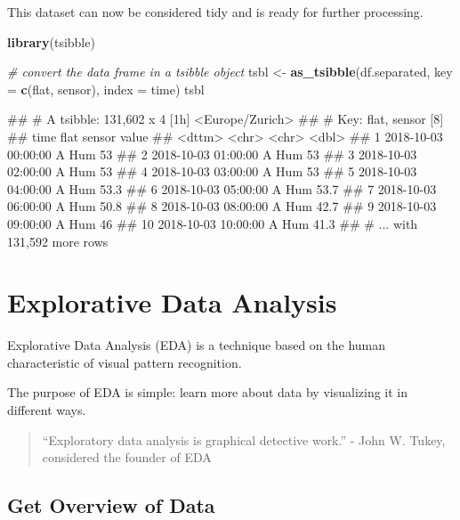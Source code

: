\documentclass[
  a4paperpaper,
]{book}
\newenvironment{Shaded}{\begin{snugshade}}{\end{snugshade}}
\newcommand{\CommentTok}[1]{\textcolor[rgb]{0.56,0.35,0.01}{\textit{#1}}}
\newcommand{\DataTypeTok}[1]{\textcolor[rgb]{0.13,0.29,0.53}{#1}}
\newcommand{\KeywordTok}[1]{\textcolor[rgb]{0.13,0.29,0.53}{\textbf{#1}}}
\newcommand{\NormalTok}[1]{#1}
\newcommand{\StringTok}[1]{\textcolor[rgb]{0.31,0.60,0.02}{#1}}
\let\oldShaded\Shaded
\let\endoldShaded\endShaded
\renewenvironment{Shaded}{\footnotesize\oldShaded}{\endoldShaded}
\let\oldverbatim\verbatim
\let\endoldverbatim\endverbatim
\renewenvironment{verbatim}{\footnotesize\oldverbatim}{\endoldverbatim}
\begin{document}
This dataset can now be considered tidy and is ready for further processing.

\begin{Shaded}
\begin{Highlighting}[]
\KeywordTok{library}\NormalTok{(tsibble)}

\CommentTok{# convert the data frame in a tsibble object}
\NormalTok{tsbl <-}\StringTok{ }\KeywordTok{as_tsibble}\NormalTok{(df.separated, }\DataTypeTok{key =} \KeywordTok{c}\NormalTok{(flat, sensor), }\DataTypeTok{index =}\NormalTok{ time)}
\NormalTok{tsbl}
\end{Highlighting}
\end{Shaded}

\begin{verbatim}
## # A tsibble: 131,602 x 4 [1h] <Europe/Zurich>
## # Key:       flat, sensor [8]
##    time                flat  sensor value
##    <dttm>              <chr> <chr>  <dbl>
##  1 2018-10-03 00:00:00 A     Hum     53  
##  2 2018-10-03 01:00:00 A     Hum     53  
##  3 2018-10-03 02:00:00 A     Hum     53  
##  4 2018-10-03 03:00:00 A     Hum     53  
##  5 2018-10-03 04:00:00 A     Hum     53.3
##  6 2018-10-03 05:00:00 A     Hum     53.7
##  7 2018-10-03 06:00:00 A     Hum     50.8
##  8 2018-10-03 08:00:00 A     Hum     42.7
##  9 2018-10-03 09:00:00 A     Hum     46  
## 10 2018-10-03 10:00:00 A     Hum     41.3
## # ... with 131,592 more rows
\end{verbatim}

\hypertarget{explorative-data-analysis}{%
\chapter{Explorative Data Analysis}\label{explorative-data-analysis}}

Explorative Data Analysis (EDA) is a technique based on the human characteristic of visual pattern recognition.

The purpose of EDA is simple: learn more about data by visualizing it in different ways.

\begin{quote}
``Exploratory data analysis is graphical detective work.'' - John W. Tukey, considered the founder of EDA
\end{quote}

\hypertarget{get-overview-of-data}{%
\section{Get Overview of Data}\label{get-overview-of-data}}
\end{document}
